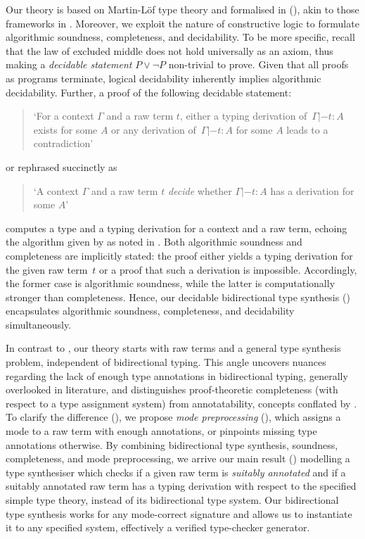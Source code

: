 Our theory is based on Martin-L\"of type theory and formalised in \Agda (), akin to those frameworks in .
Moreover, we exploit the nature of constructive logic to formulate algorithmic soundness, completeness, and decidability. 
To be more specific, recall that the law of excluded middle does not hold universally as an axiom, thus making a \emph{decidable statement} $P \vee \neg P$ non-trivial to prove.
Given that all proofs as programs terminate, logical decidability inherently implies algorithmic decidability.
Further, a proof of the following decidable statement:
\begin{quote}
  `For a context $\Gamma$ and a raw term $t$, either a typing derivation of\, $\Gamma |- t : A$ exists for some $A$ or any derivation of\, $\Gamma |- t : A$ for some $A$ leads to a contradiction'
\end{quote}
or rephrased succinctly as 
\begin{quote}
  `A context $\Gamma$ and a raw term $t$ \emph{decide} whether $\Gamma |- t : A$ has a derivation for some $A$'
\end{quote}
computes a type and a typing derivation for a context and a raw term, echoing the algorithm given by \citeauthor{Wadler2022} as noted in .
Both algorithmic soundness and completeness are implicitly stated:
the proof either yields a typing derivation for the given raw term~$t$ or a proof that such a derivation is impossible.
Accordingly, the former case is algorithmic soundness, while the latter is computationally stronger than completeness.
Hence, our decidable bidirectional type synthesis () encapsulates algorithmic soundness, completeness, and decidability simultaneously. 

In contrast to \citeauthor{Wadler2022}, our theory starts with raw terms and a general type synthesis problem, independent of bidirectional typing.
This angle uncovers nuances regarding the lack of enough type annotations in bidirectional typing, generally overlooked in literature, and distinguishes proof-theoretic completeness (with respect to a type assignment system) from annotatability, concepts conflated by \citet{Dunfield2021}. 
To clarify the difference (), we propose \emph{mode preprocessing} (), which assigns a mode to a raw term with enough annotations, or pinpoints missing type annotations otherwise.
By combining bidirectional type synthesis, soundness, completeness, and mode preprocessing, we arrive our main result () modelling a type synthesiser which checks if a given raw term is \emph{suitably annotated} and if a suitably annotated raw term has a typing derivation with respect to the specified simple type theory, instead of its bidirectional type system.
Our bidirectional type synthesis works for any mode-correct signature and allows us to instantiate it to any specified system, effectively a verified type-checker generator. 

